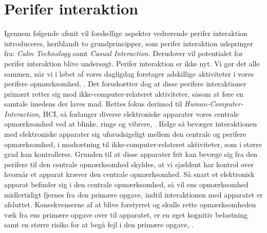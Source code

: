 \section{Perifer interaktion}
\label{PeriferInteratkion}
%
Igennem følgende afsnit vil forskellige aspekter vedrørende perifer interaktion introduceres, heriblandt to grundprincipper, som perifer interaktion udspringer fra: \textit{Calm Technology} samt \textit{Casual Interaction}. Derudover vil potentialet for perifer interaktion blive undersøgt.\blankline
%
Perifer interaktion er ikke nyt. Vi gør det alle sammen, når vi i løbet af vores dagligdag foretager adskillige aktiviteter i vores perifere opmærksomhed, \parencite[s. 1]{PDF:PIIntroduction}. Det forudsætter dog at disse perifere interaktioner primært retter sig mod ikke-computer-relateret aktiviteter, såsom at føre en samtale imedens der laves mad. Rettes fokus derimod til \textit{Human-Computer-Interaction}, HCI, så forlanger diverse elektroniske apparater vores centrale opmærksomhed ved at blinke, ringe og vibrere, \parencite[s. 1]{PDF:PIIntroduction}. Ifølge \textcite[s. 3]{PDF:PIIntroduction} så bevæger interaktionen med elektroniske apparater sig uforudsigeligt mellem den centrale og perifere opmærksomhed, i modsætning til ikke-computer-relateret aktiviteter, som i større grad kan kontrolleres. Grunden til at disse apparater frit kan bevæge sig fra den perifere til den centrale opmærksomhed skyldes, at vi sjældent har kontrol over hvornår et apparat kræver den centrale opmærksomhed. Så snart et elektronisk apparat befinder sig i den centrale opmærksomhed, så vil ens opmærksomhed midlertidigt fjernes fra den primære opgave, indtil interaktionen med apparatet er afsluttet. Konsekvenserne af at blive forstyrret og skulle rette opmærksomheden væk fra ens primære opgave over til apparatet, er en øget kognitiv belastning samt en større risiko for at begå fejl i den primære opgave, \parencite[ss. 188-189][s. 162]{PDF:PIDesktopComputingKap9, PDF:ComparingInputModalities}. 

